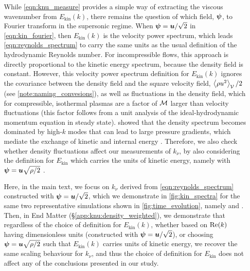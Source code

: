 While \autoref{eqn:knu_measure} provides a simple way of extracting the viscous wavenumber from $E_\mathrm{kin}(k)$, there remains the question of which field, $\bm{\psi}$, to Fourier transform in the supersonic regime. When $\bm{\psi} = \bm{u}/\sqrt{2}$ in \autoref{eqn:kin_fourier}, then $E_\mathrm{kin}(k)$ is the velocity power spectrum, which leads \autoref{eqn:reynolds_spectrum} to carry the same units as the usual definition of the hydrodynamic Reynolds number. For incompressible flows, this approach is directly proportional to the kinetic energy spectrum, because the density field is constant. However, this velocity power spectrum definition for $E_\mathrm{kin}(k)$ ignores the covariance between the density field and the square velocity field, \ie $\left\langle \rho u^2 \right\rangle_{\mathcal{V}} / 2$ (see \autoref{note:naming_convesions}), as well as fluctuations in the density field, which for compressible, isothermal plasmas are a factor of $\mathcal{M}$ larger than velocity fluctuations (this factor follows from a unit analysis of the ideal-hydrodynamic momentum equation in steady state). \citet{beattie2020filaments} showed that the density spectrum becomes dominated by high-$k$ modes that can lead to large pressure gradients, which mediate the exchange of kinetic and internal energy \citep[see for example][]{federrath2010comparing, federrath2013universality, schmidt2019kinetic, grete2021matter, grete2023matter}. Therefore, we also check whether density fluctuations affect our measurements of $k_\nu$, by also considering the definition for $E_\mathrm{kin}$ which carries the units of kinetic energy, namely with $\bm{\psi} = \bm{u} \sqrt{\rho/2}$ \citep[see, e.g., ][]{federrath2010comparing, grete2021matter, grete2023matter}.

Here, in the main text, we focus on $k_\nu$ derived from \autoref{eqn:reynolds_spectrum} constructed with $\bm{\psi} = \bm{u}/\sqrt{2}$, which we demonstrate in \autoref{fig:kin_spectra} for the same two representative simulations shown in \autoref{fig:time_evolution}, namely  and . Then, in End Matter (\S\ref{app:knu:density_weighted}), we demonstrate that regardless of the choice of definition for $E_\mathrm{kin}(k)$, whether based on $\mathrm{Re}(k)$ having dimensionless units (\ie constructed with $\bm{\psi} = \bm{u} / \sqrt{2}$), or choosing $\bm{\psi} = \bm{u} \sqrt{\rho/2}$ such that $E_\mathrm{kin}(k)$ carries units of kinetic energy, we recover the same scaling behaviour for $k_\nu$, and thus the choice of definition for $E_\mathrm{kin}$ does not affect any of the conclusions presented in our study.

